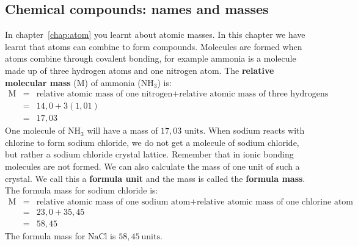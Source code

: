             \subsection*{Chemical compounds: names and masses}
            \nopagebreak
\label{m38689*uid97124}In chapter~\ref{chap:atom} you learnt about atomic masses. In this chapter we have learnt that atoms can combine to form compounds. Molecules are formed when atoms combine through covalent bonding, for example ammonia is a molecule made up of three hydrogen atoms and one nitrogen atom. The \textbf{relative molecular mass} ($\text{M}$) of ammonia ($\text{NH}_{3}$) is: \\
\begin{eqnarray*}
 \text{M} & = & \text{relative atomic mass of one nitrogen} + \text{relative atomic mass of three hydrogens} \\
 & = & 14,0 + 3(1,01)  \\ 
 & = & 17,03
\end{eqnarray*}
One molecule of $\text{NH}_{3}$ will have a  mass of $17,03\text{ units}$. When sodium reacts with chlorine to form sodium chloride, we do not get a molecule of sodium chloride, but rather a sodium chloride crystal lattice. Remember that in ionic bonding molecules are not formed. We can also calculate the mass of one unit of such a crystal. We call this a \textbf{formula unit} and the mass is called the \textbf{formula mass}. The formula mass for sodium chloride is:
 \begin{eqnarray*}
 \text{M} & = & \text{relative atomic mass of one sodium atom} + \text{relative atomic mass of one chlorine atom}\\
 & = & 23,0 + 35,45 \\
 & = & 58,45
\end{eqnarray*} 
The formula mass for $\text{NaCl}$ is $58,45~\text{units}$.
      \label{m38689*secfhsst!!!underscore!!!id822}
